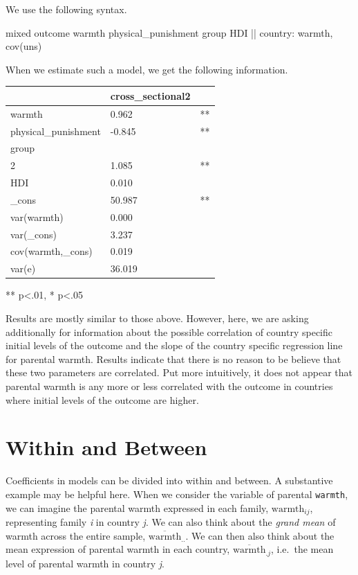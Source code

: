 \documentclass[
  letterpaper,
  DIV=11,
  numbers=noendperiod]{scrreprt}
\newenvironment{Shaded}{\begin{snugshade}}{\end{snugshade}}
\newcommand{\FunctionTok}[1]{\textcolor[rgb]{0.28,0.35,0.67}{#1}}
\newcommand{\NormalTok}[1]{\textcolor[rgb]{0.00,0.23,0.31}{#1}}
\begin{document}
We use the following syntax.

\begin{Shaded}
\begin{Highlighting}[]

\NormalTok{mixed outcome warmth physical\_punishment }\FunctionTok{group}\NormalTok{ HDI || country: warmth, cov(uns)}
\end{Highlighting}
\end{Shaded}

When we estimate such a model, we get the following information.

\begin{longtable}[]{@{}lll@{}}
\toprule\noalign{}
& cross\_sectional2 & \\
\midrule\noalign{}
\endhead
\bottomrule\noalign{}
\endlastfoot
warmth & 0.962 & ** \\
physical\_punishment & -0.845 & ** \\
group & & \\
2 & 1.085 & ** \\
HDI & 0.010 & \\
\_cons & 50.987 & ** \\
var(warmth) & 0.000 & \\
var(\_cons) & 3.237 & \\
cov(warmth,\_cons) & 0.019 & \\
var(e) & 36.019 & \\
\end{longtable}

** p\textless.01, * p\textless.05

Results are mostly similar to those above. However, here, we are asking
additionally for information about the possible correlation of country
specific initial levels of the outcome and the slope of the country
specific regression line for parental warmth. Results indicate that
there is no reason to be believe that these two parameters are
correlated. Put more intuitively, it does not appear that parental
warmth is any more or less correlated with the outcome in countries
where initial levels of the outcome are higher.

\section{Within and Between}\label{sec-withinbetween}

Coefficients in models can be divided into within and between. A
substantive example may be helpful here. When we consider the variable
of parental \texttt{warmth}, we can imagine the parental warmth
expressed in each family, \(\text{warmth}_{ij}\), representing family
\emph{i} in country \emph{j}. We can also think about the \emph{grand
mean} of warmth across the entire sample,
\(\overline{\text{warmth}}_{..}\). We can then also think about the mean
expression of parental warmth in each country,
\(\overline{\text{warmth}}_{.j}\), i.e.~the mean level of parental
warmth in country \emph{j}.
\end{document}
